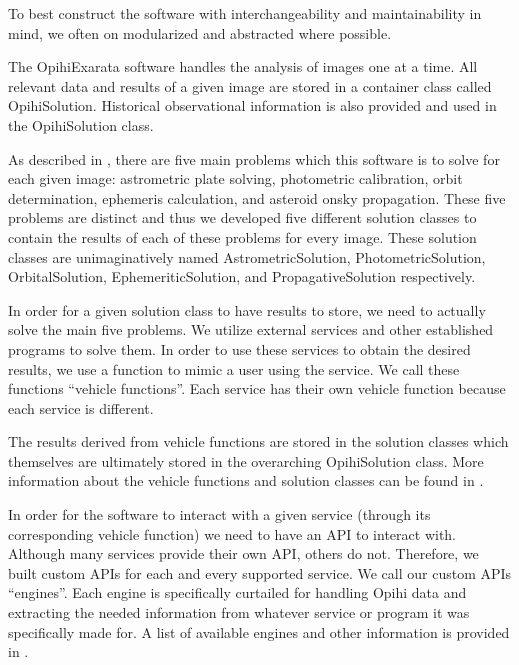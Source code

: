 \documentclass[letterpaper,11pt,english]{sphinxmanual}
\begin{document}
\sphinxAtStartPar
To best construct the software with interchangeability and maintainability in
mind, we often on modularized and abstracted where possible.

\sphinxAtStartPar
The OpihiExarata software handles the analysis of images one at a time.
All relevant data and results of a given image are stored in a container
class called OpihiSolution. Historical observational information is also
provided and used in the OpihiSolution class.

\sphinxAtStartPar
As described in {\hyperref[\detokenize{user/system_framework:user-system-framework}]{}}, there are five main problems
which this software is to solve for each given image: astrometric plate
solving, photometric calibration, orbit determination, ephemeris calculation,
and asteroid on\sphinxhyphen{}sky propagation. These five problems are distinct and thus we
developed five different solution classes to contain the results of each of
these problems for every image. These solution classes are unimaginatively
named AstrometricSolution, PhotometricSolution, OrbitalSolution,
EphemeriticSolution, and PropagativeSolution respectively.

\sphinxAtStartPar
In order for a given solution class to have results to store, we need to
actually solve the main five problems. We utilize external services and
other established programs to solve them. In order to use these services to
obtain the desired results, we use a function to mimic a user using the
service. We call these functions “vehicle functions”. Each service has their
own vehicle function because each service is different.

\sphinxAtStartPar
The results derived from vehicle functions are stored in the solution classes
which themselves are ultimately stored in the overarching OpihiSolution class.
More information about the vehicle functions and solution classes can be found
in {\hyperref[\detokenize{technical/architecture/vehicles_solutions:technical-architecture-vehicles-solutions}]{}}.

\sphinxAtStartPar
In order for the software to interact with a given service (through its
corresponding vehicle function) we need to have an API to interact with.
Although many services provide their own API, others do not. Therefore, we
built custom APIs for each and every supported service. We call our custom
APIs “engines”. Each engine is specifically curtailed for handling Opihi
data and extracting the needed information from whatever service or program it
was specifically made for. A list of available engines and other information
is provided in {\hyperref[\detokenize{technical/architecture/services_engines:technical-architecture-services-engines}]{}}.
\end{document}

